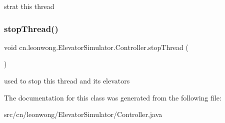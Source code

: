 strat this thread \mbox{\label{classcn_1_1leonwong_1_1_elevator_simulator_1_1_controller_a9c5e5f2cccaf70952c8764d939defb32}} 
\subsubsection{\texorpdfstring{stop\+Thread()}{stopThread()}}
{\footnotesize\ttfamily void cn.\+leonwong.\+Elevator\+Simulator.\+Controller.\+stop\+Thread (\begin{DoxyParamCaption}{ }\end{DoxyParamCaption})}

used to stop this thread and its elevators 

The documentation for this class was generated from the following file\+:\begin{DoxyCompactItemize}
\item 
src/cn/leonwong/\+Elevator\+Simulator/Controller.\+java\end{DoxyCompactItemize}
